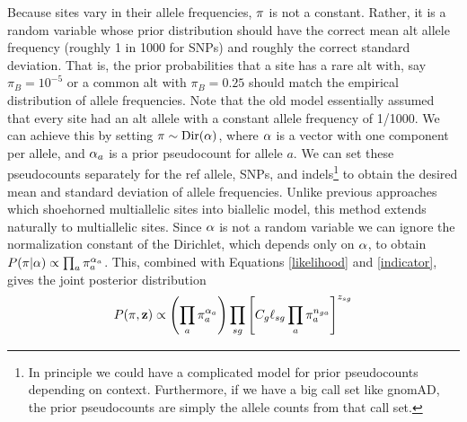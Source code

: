 \documentclass[nofootinbib,amssymb,amsmath]{revtex4}
\newcommand{\vz}{{\bf z}}
\newcommand{\vpi}{{\bf \pi}}
\newcommand{\valpha}{{\bf \alpha}}
\begin{document}
Because sites vary in their allele frequencies, $\vpi$ is not a constant.  Rather, it is a random variable whose prior distribution should have the correct mean alt allele frequency (roughly 1 in 1000 for SNPs) and roughly the correct standard deviation.  That is, the prior probabilities that a site has a rare alt with, say $\pi_B = 10^{-5}$ or a common alt with $\pi_B = 0.25$ should match the empirical distribution of allele frequencies.  Note that the old model essentially assumed that every site had an alt allele with a constant allele frequency of 1/1000.  We can achieve this by setting $\vpi \sim {\rm Dir}(\valpha)$, where $\valpha$ is a vector with one component per allele, and $\valpha_a$ is a prior pseudocount for allele $a$.  We can set these pseudocounts separately for the ref allele, SNPs, and indels\footnote{In principle we could have a complicated model for prior pseudocounts depending on context.  Furthermore, if we have a big call set like gnomAD, the prior pseudocounts are simply the allele counts from that call set.} to obtain the desired mean and standard deviation of allele frequencies.  Unlike previous approaches which shoehorned multiallelic sites into  biallelic model, this method extends naturally to multiallelic sites.  Since $\valpha$ is not a random variable we can ignore the normalization constant of the Dirichlet, which depends only on $\valpha$, to obtain $P(\vpi | \valpha) \propto  \prod_a \pi_a^{\alpha_a}$.  This, combined with Equations \ref{likelihood} and \ref{indicator}, gives the joint posterior distribution
\begin{equation}
P(\vpi, \vz) \propto \left( \prod_a \pi_a^{\alpha_a} \right) \prod_{sg} \left[ C_g \ell_{sg} \prod_a \pi_a^{n_{ga}} \right]^{z_{sg}}
\end{equation}
\end{document}
